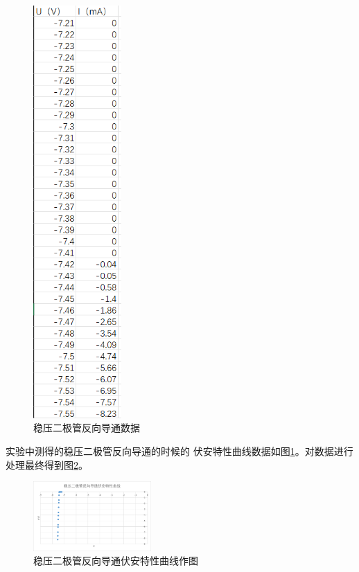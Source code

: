 \documentclass{ctexart}
\begin{document}
  \begin{figure}\label{wenyafanxiangshujv}
    \centering
    \includegraphics[width=0.3\textwidth,height=0.4\textheight]{wenyafanxiangshujv.png}
    \caption{稳压二极管反向导通数据}
  \end{figure}
  实验中测得的稳压二极管反向导通的时候的
  伏安特性曲线数据如图\ref{wenyafanxiangshujv}。对数据进行处理最终得到图\ref{wenyafanxiangzuotu}。
  \newpage
  \begin{figure}[h]\label{wenyafanxiangzuotu}
    \centering
    \includegraphics[width=0.4\textwidth,height=0.3\textheight]{wenyafanxiangzuotu.png}
    \caption{稳压二极管反向导通伏安特性曲线作图}
  \end{figure}
\end{document}
